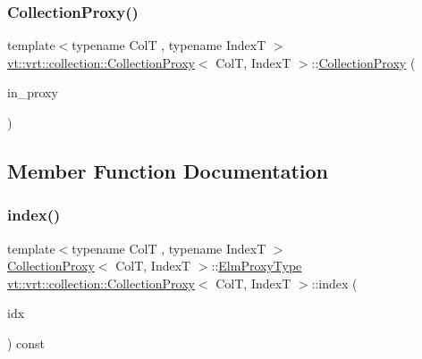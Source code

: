 \mbox{\label{structvt_1_1vrt_1_1collection_1_1_collection_proxy_ac4762724e6b3c028f183b42f635d69ce}} 
\subsubsection{\texorpdfstring{Collection\+Proxy()}{CollectionProxy()}\hspace{0.1cm}{\footnotesize\ttfamily [3/3]}}
{\footnotesize\ttfamily template$<$typename ColT , typename IndexT $>$ \\
\hyperlink{structvt_1_1vrt_1_1collection_1_1_collection_proxy}{vt\+::vrt\+::collection\+::\+Collection\+Proxy}$<$ ColT, IndexT $>$\+::\hyperlink{structvt_1_1vrt_1_1collection_1_1_collection_proxy}{Collection\+Proxy} (\begin{DoxyParamCaption}\item[{\hyperlink{namespacevt_a1b417dd5d684f045bb58a0ede70045ac}{Virtual\+Proxy\+Type} const}]{in\+\_\+proxy }\end{DoxyParamCaption})}



\subsection{Member Function Documentation}
\mbox{\label{structvt_1_1vrt_1_1collection_1_1_collection_proxy_a9dcc562f78ac9f7dbef426c33c3b6f53}} 
\subsubsection{\texorpdfstring{index()}{index()}}
{\footnotesize\ttfamily template$<$typename ColT , typename IndexT $>$ \\
\hyperlink{structvt_1_1vrt_1_1collection_1_1_collection_proxy}{Collection\+Proxy}$<$ ColT, IndexT $>$\+::\hyperlink{structvt_1_1vrt_1_1collection_1_1_collection_proxy_a892c21eae1dca37321d7973f72b55b0a}{Elm\+Proxy\+Type} \hyperlink{structvt_1_1vrt_1_1collection_1_1_collection_proxy}{vt\+::vrt\+::collection\+::\+Collection\+Proxy}$<$ ColT, IndexT $>$\+::index (\begin{DoxyParamCaption}\item[{IndexT const \&}]{idx }\end{DoxyParamCaption}) const}

